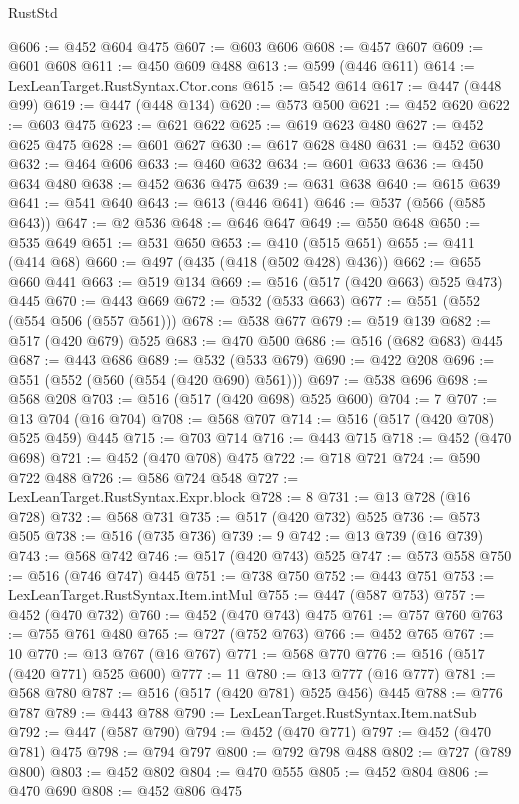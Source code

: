 \begin{lexlean}{RustStd}
\begin{coremodule}
@606 := @452 @604 @475
@607 := @603 @606
@608 := @457 @607
@609 := @601 @608
@611 := @450 @609 @488
@613 := @599 (@446 @611)
@614 := LexLeanTarget.RustSyntax.Ctor.cons
@615 := @542 @614
@617 := @447 (@448 @99)
@619 := @447 (@448 @134)
@620 := @573 @500
@621 := @452 @620
@622 := @603 @475
@623 := @621 @622
@625 := @619 @623 @480
@627 := @452 @625 @475
@628 := @601 @627
@630 := @617 @628 @480
@631 := @452 @630
@632 := @464 @606
@633 := @460 @632
@634 := @601 @633
@636 := @450 @634 @480
@638 := @452 @636 @475
@639 := @631 @638
@640 := @615 @639
@641 := @541 @640
@643 := @613 (@446 @641)
@646 := @537 (@566 (@585 @643))
@647 := @2 @536
@648 := @646 @647
@649 := @550 @648
@650 := @535 @649
@651 := @531 @650
@653 := @410 (@515 @651)
@655 := @411 (@414 @68)
@660 := @497 (@435 (@418 (@502 @428) @436))
@662 := @655 @660 @441
@663 := @519 @134
@669 := @516 (@517 (@420 @663) @525 @473) @445
@670 := @443 @669
@672 := @532 (@533 @663)
@677 := @551 (@552 (@554 @506 (@557 @561)))
@678 := @538 @677
@679 := @519 @139
@682 := @517 (@420 @679) @525
@683 := @470 @500
@686 := @516 (@682 @683) @445
@687 := @443 @686
@689 := @532 (@533 @679)
@690 := @422 @208
@696 := @551 (@552 (@560 (@554 (@420 @690) @561)))
@697 := @538 @696
@698 := @568 @208
@703 := @516 (@517 (@420 @698) @525 @600)
@704 := 7
@707 := @13 @704 (@16 @704)
@708 := @568 @707
@714 := @516 (@517 (@420 @708) @525 @459) @445
@715 := @703 @714
@716 := @443 @715
@718 := @452 (@470 @698)
@721 := @452 (@470 @708) @475
@722 := @718 @721
@724 := @590 @722 @488
@726 := @586 @724 @548
@727 := LexLeanTarget.RustSyntax.Expr.block
@728 := 8
@731 := @13 @728 (@16 @728)
@732 := @568 @731
@735 := @517 (@420 @732) @525
@736 := @573 @505
@738 := @516 (@735 @736)
@739 := 9
@742 := @13 @739 (@16 @739)
@743 := @568 @742
@746 := @517 (@420 @743) @525
@747 := @573 @558
@750 := @516 (@746 @747) @445
@751 := @738 @750
@752 := @443 @751
@753 := LexLeanTarget.RustSyntax.Item.intMul
@755 := @447 (@587 @753)
@757 := @452 (@470 @732)
@760 := @452 (@470 @743) @475
@761 := @757 @760
@763 := @755 @761 @480
@765 := @727 (@752 @763)
@766 := @452 @765
@767 := 10
@770 := @13 @767 (@16 @767)
@771 := @568 @770
@776 := @516 (@517 (@420 @771) @525 @600)
@777 := 11
@780 := @13 @777 (@16 @777)
@781 := @568 @780
@787 := @516 (@517 (@420 @781) @525 @456) @445
@788 := @776 @787
@789 := @443 @788
@790 := LexLeanTarget.RustSyntax.Item.natSub
@792 := @447 (@587 @790)
@794 := @452 (@470 @771)
@797 := @452 (@470 @781) @475
@798 := @794 @797
@800 := @792 @798 @488
@802 := @727 (@789 @800)
@803 := @452 @802
@804 := @470 @555
@805 := @452 @804
@806 := @470 @690
@808 := @452 @806 @475

\end{coremodule}
\end{lexlean}
